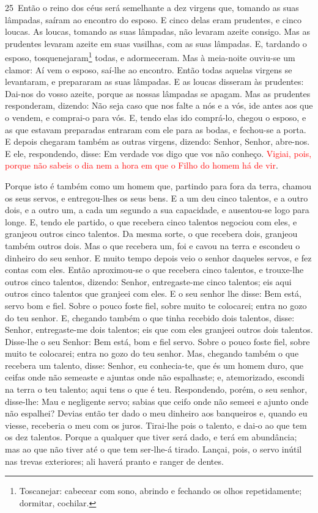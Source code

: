 \medskip

\lettrine{25}\ Então o reino dos céus será semelhante a dez
virgens que, tomando as suas lâmpadas, saíram ao encontro do esposo.
E cinco delas eram prudentes, e cinco loucas. As loucas,
tomando as suas lâmpadas, não levaram azeite consigo. Mas as
prudentes levaram azeite em suas vasilhas, com as suas lâmpadas.
E, tardando o esposo, tosquenejaram\footnote{Toscanejar:
cabecear com sono, abrindo e fechando os olhos repetidamente;
dormitar, cochilar.} todas, e adormeceram. Mas à meia-noite
ouviu-se um clamor: Aí vem o esposo, saí-lhe ao encontro. Então
todas aquelas virgens se levantaram, e prepararam as suas lâmpadas.
E as loucas disseram às prudentes: Dai-nos do vosso azeite,
porque as nossas lâmpadas se apagam. Mas as prudentes
responderam, dizendo: Não seja caso que nos falte a nós e a vós, ide
antes aos que o vendem, e comprai-o para vós. E, tendo elas
ido comprá-lo, chegou o esposo, e as que estavam preparadas entraram
com ele para as bodas, e fechou-se a porta. E depois chegaram
também as outras virgens, dizendo: Senhor, Senhor, abre-nos.
E ele, respondendo, disse: Em verdade vos digo que vos não
conheço. \textcolor{red}{Vigiai, pois, porque não sabeis o dia nem a
hora em que o Filho do homem há de vir}.

Porque isto é também como um homem que, partindo para fora da
terra, chamou os seus servos, e entregou-lhes os seus bens. E
a um deu cinco talentos, e a outro dois, e a outro um, a cada um
segundo a sua capacidade, e ausentou-se logo para longe. E,
tendo ele partido, o que recebera cinco talentos negociou com eles,
e granjeou outros cinco talentos. Da mesma sorte, o que
recebera dois, granjeou também outros dois. Mas o que
recebera um, foi e cavou na terra e escondeu o dinheiro do seu
senhor. E muito tempo depois veio o senhor daqueles servos, e
fez contas com eles. Então aproximou-se o que recebera cinco
talentos, e trouxe-lhe outros cinco talentos, dizendo: Senhor,
entregaste-me cinco talentos; eis aqui outros cinco talentos que
granjeei com eles. E o seu senhor lhe disse: Bem está, servo
bom e fiel. Sobre o pouco foste fiel, sobre muito te colocarei;
entra no gozo do teu senhor. E, chegando também o que tinha
recebido dois talentos, disse: Senhor, entregaste-me dois talentos;
eis que com eles granjeei outros dois talentos. Disse-lhe o
seu Senhor: Bem está, bom e fiel servo. Sobre o pouco foste fiel,
sobre muito te colocarei; entra no gozo do teu senhor. Mas,
chegando também o que recebera um talento, disse: Senhor, eu
conhecia-te, que és um homem duro, que ceifas onde não semeaste e
ajuntas onde não espalhaste; e, atemorizado, escondi na terra
o teu talento; aqui tens o que é teu. Respondendo, porém, o
seu senhor, disse-lhe: Mau e negligente servo; sabias que ceifo onde
não semeei e ajunto onde não espalhei? Devias então ter dado
o meu dinheiro aos banqueiros e, quando eu viesse, receberia o meu
com os juros. Tirai-lhe pois o talento, e dai-o ao que tem os
dez talentos. Porque a qualquer que tiver será dado, e terá
em abundância; mas ao que não tiver até o que tem ser-lhe-á tirado.
Lançai, pois, o servo inútil nas trevas exteriores; ali
haverá pranto e ranger de dentes.

